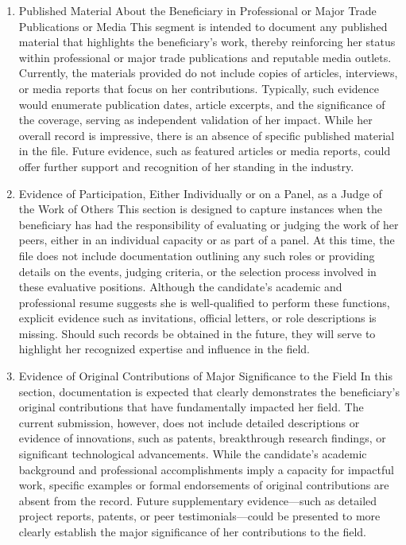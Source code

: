 \begin{enumerate}
\item Published Material About the Beneficiary in Professional or Major Trade Publications or Media
This segment is intended to document any published material that highlights the beneficiary’s work, thereby reinforcing her status within professional or major trade publications and reputable media outlets. Currently, the materials provided do not include copies of articles, interviews, or media reports that focus on her contributions. Typically, such evidence would enumerate publication dates, article excerpts, and the significance of the coverage, serving as independent validation of her impact. While her overall record is impressive, there is an absence of specific published material in the file. Future evidence, such as featured articles or media reports, could offer further support and recognition of her standing in the industry.

\item Evidence of Participation, Either Individually or on a Panel, as a Judge of the Work of Others
This section is designed to capture instances when the beneficiary has had the responsibility of evaluating or judging the work of her peers, either in an individual capacity or as part of a panel. At this time, the file does not include documentation outlining any such roles or providing details on the events, judging criteria, or the selection process involved in these evaluative positions. Although the candidate’s academic and professional resume suggests she is well-qualified to perform these functions, explicit evidence such as invitations, official letters, or role descriptions is missing. Should such records be obtained in the future, they will serve to highlight her recognized expertise and influence in the field.

\item Evidence of Original Contributions of Major Significance to the Field
In this section, documentation is expected that clearly demonstrates the beneficiary’s original contributions that have fundamentally impacted her field. The current submission, however, does not include detailed descriptions or evidence of innovations, such as patents, breakthrough research findings, or significant technological advancements. While the candidate’s academic background and professional accomplishments imply a capacity for impactful work, specific examples or formal endorsements of original contributions are absent from the record. Future supplementary evidence—such as detailed project reports, patents, or peer testimonials—could be presented to more clearly establish the major significance of her contributions to the field.


\end{enumerate}
